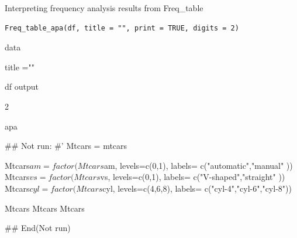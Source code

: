 \documentclass[a4paper]{book}
\begin{document}
%
\begin{Description}
Interpreting frequency analysis results from Freq\_table
\end{Description}
%
\begin{Usage}
\begin{verbatim}
Freq_table_apa(df, title = "", print = TRUE, digits = 2)
\end{verbatim}
\end{Usage}
%
\begin{Arguments}
\begin{ldescription}
\item[\code{df}] data

\item[\code{title}] title =""

\item[\code{print}] df output

\item[\code{digits}] 2
\end{ldescription}
\end{Arguments}
%
\begin{Value}
apa
\end{Value}
%
\begin{Examples}
\begin{ExampleCode}

\#\# Not run: 
#'
Mtcars = mtcars

Mtcars$am = factor(Mtcars$am, levels=c(0,1), labels= c("automatic","manual" ))
Mtcars$vs  = factor(Mtcars$vs, levels=c(0,1), labels= c("V-shaped","straight" ))
Mtcars$cyl  = factor(Mtcars$cyl, levels=c(4,6,8), labels= c("cyl-4","cyl-6","cyl-8"))

Mtcars %
Mtcars %
Mtcars %

## End(Not run)

\end{ExampleCode}
\end{Examples}
\end{document}
